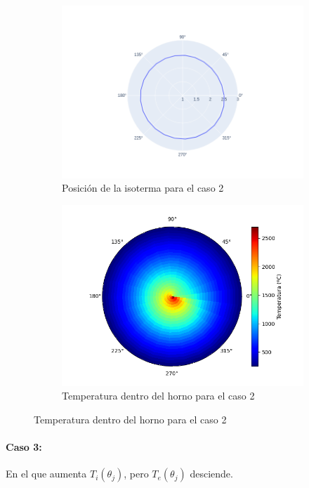 \documentclass[12pt]{article}
\begin{document}
\begin{figure}[H]
\centering
\begin{subfigure}{0.5\textwidth}
  \includegraphics[scale=0.4]{uniform.1.isotherm}
  \caption{Posición de la isoterma para el caso 2}
\end{subfigure}%
\begin{subfigure}{0.5\textwidth}
  \includegraphics[scale=0.5]{uniform.1.temperature}
  \caption{Temperatura dentro del horno para el caso 2}
\end{subfigure}
\label{fig:uniform.1}
\end{figure}

\paragraph{Caso 3:} En el que aumenta \(T_i(\theta_j)\), pero \(T_e(\theta_j)\) desciende.
\end{document}
